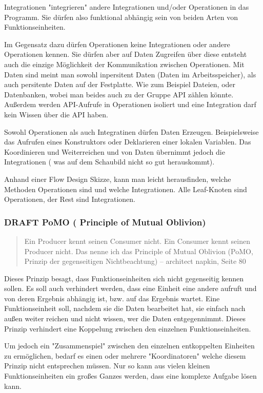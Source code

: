 \documentclass[11pt]{article}
\begin{document}
Integrationen "integrieren" andere Integrationen und/oder Operationen in das Programm. Sie dürfen also funktional abhängig sein
von beiden Arten von Funktionseinheiten.

Im Gegensatz dazu dürfen Operationen keine Integrationen oder andere Operationen kennen. 
Sie dürfen aber auf Daten Zugreifen über diese entsteht auch die einzige Möglichkeit der Kommunikation zwischen Operationen.
Mit Daten sind meint man sowohl inpersitent Daten (Daten im Arbeitsspeicher), als auch persitente Daten auf der Festplatte.
Wie zum Beispiel Dateien, oder Datenbanken, wobei man beides auch zu der Gruppe API zählen könnte. 
Außerdem werden API-Aufrufe in Operationen isoliert und eine Integration darf kein Wissen über die API haben.

Sowohl Operationen als auch Integratinen dürfen Daten Erzeugen.
Beispielsweise das Aufrufen eines Konstruktors oder Deklarieren einer lokalen Variablen.
Das Koordinieren und Weiterreichen und von Daten übernimmt jedoch die Integrationen ( was auf dem Schaubild nicht so
gut herauskommt).

Anhand einer Flow Design Skizze, kann man leicht herausfinden, welche Methoden Operationen sind und welche
Integrationen.
Alle Leaf-Knoten sind Operationen, der Rest sind Integrationen.



\subsubsection{{\bfseries\sffamily DRAFT} PoMO ( Principle of Mutual Oblivion)}
\label{sec:orgheadline35}
\begin{quote}
Ein Producer kennt seinen Consumer nicht. Ein Consumer kennt seinen Producer
nicht. Das nenne ich das Principle of Mutual Oblivion (PoMO,
Prinzip der gegenseitigen Nichtbeachtung) -- architect napkin, Seite 80
\end{quote}

Dieses Prinzip besagt, dass Funktionseinheiten sich nicht gegenseitig kennen sollen.
Es soll auch verhindert werden, dass eine Einheit eine andere aufruft und von deren Ergebnis
abhängig ist, bzw. auf das Ergebnis wartet.
Eine Funktionseinheit soll, nachdem sie die Daten bearbeitet hat, sie einfach nach
außen weiter reichen und nicht wissen, wer die Daten entgegennimmt.
Dieses Prinzip verhindert eine Koppelung zwischen den einzelnen Funktionseinheiten.

Um jedoch ein "Zusammenspiel" zwischen den einzelnen entkoppelten Einheiten zu ermöglichen, bedarf es einen oder
mehrere "Koordinatoren" welche diesem Prinzip nicht entsprechen müssen.
Nur so kann aus vielen kleinen Funktionseinheiten ein großes Ganzes werden, dass eine komplexe Aufgabe lösen kann.
\end{document}
